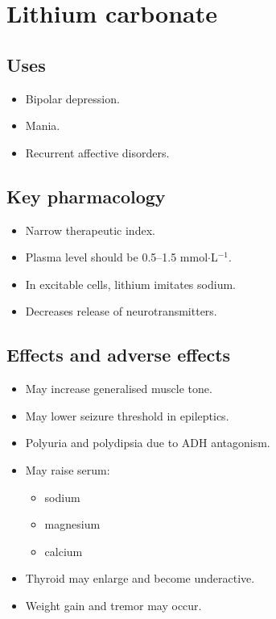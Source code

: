 \documentclass[11pt,a4paper]{article}
\begin{document}
\section{Lithium carbonate}

\subsection{Uses}
\begin{itemize}
  \item Bipolar depression.
  \item Mania.
  \item Recurrent affective disorders.
\end{itemize}

\subsection{Key pharmacology}
\begin{itemize}
  \item Narrow therapeutic index.
  \item Plasma level should be 0.5--1.5 mmol$\cdot$L$^{-1}$.
  \item In excitable cells, lithium imitates sodium.
  \item Decreases release of neurotransmitters.
\end{itemize}

\subsection{Effects and adverse effects}
\begin{itemize}
  \item May increase generalised muscle tone.
  \item May lower seizure threshold in epileptics.
  \item Polyuria and polydipsia due to ADH antagonism.
  \item May raise serum:
  \begin{itemize}
    \item sodium
    \item magnesium
    \item calcium
  \end{itemize}
  \item Thyroid may enlarge and become underactive.
  \item Weight gain and tremor may occur.
\end{itemize}
\end{document}
